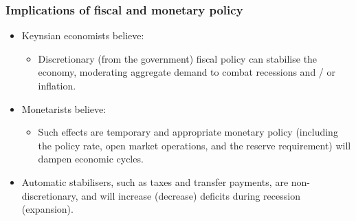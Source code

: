 \documentclass[../notes_compiled.tex]{subfiles}
\begin{document}
\subsubsection{Implications of fiscal and monetary policy}
\begin{itemize}
\item Keynsian economists believe:
\begin{itemize}
\item Discretionary (from the government) fiscal policy can stabilise the economy, moderating aggregate demand to combat recessions and / or inflation.
\end{itemize}

\item Monetarists believe:
\begin{itemize}
\item Such effects are temporary and appropriate monetary policy (including the policy rate, open market operations, and the reserve requirement) will dampen economic cycles.
\end{itemize}

\item Automatic stabilisers, such as taxes and transfer payments, are non-discretionary, and will increase (decrease) deficits during recession (expansion).


\end{itemize}
\end{document}
